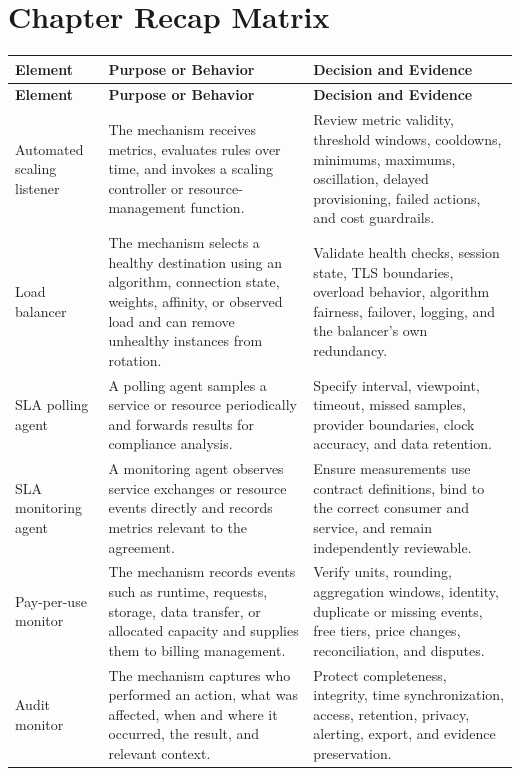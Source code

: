 \documentclass[11pt]{article}
\begin{document}
\section{Chapter Recap Matrix}
\begingroup\small\setlength{\tabcolsep}{4pt}
\begin{longtable}{@{}>{\RaggedRight\arraybackslash}p{}>{\RaggedRight\arraybackslash}p{}>{\RaggedRight\arraybackslash}p{}@{}}
\toprule\rowcolor{Navy}\color{white}\textbf{Element} & \color{white}\textbf{Purpose or Behavior} & \color{white}\textbf{Decision and Evidence}\\\midrule\endfirsthead
\toprule\rowcolor{Navy}\color{white}\textbf{Element} & \color{white}\textbf{Purpose or Behavior} & \color{white}\textbf{Decision and Evidence}\\\midrule\endhead
Automated scaling listener & The mechanism receives metrics, evaluates rules over time, and invokes a scaling controller or resource-management function. & Review metric validity, threshold windows, cooldowns, minimums, maximums, oscillation, delayed provisioning, failed actions, and cost guardrails. \\\midrule
Load balancer & The mechanism selects a healthy destination using an algorithm, connection state, weights, affinity, or observed load and can remove unhealthy instances from rotation. & Validate health checks, session state, TLS boundaries, overload behavior, algorithm fairness, failover, logging, and the balancer's own redundancy. \\\midrule
SLA polling agent & A polling agent samples a service or resource periodically and forwards results for compliance analysis. & Specify interval, viewpoint, timeout, missed samples, provider boundaries, clock accuracy, and data retention. \\\midrule
SLA monitoring agent & A monitoring agent observes service exchanges or resource events directly and records metrics relevant to the agreement. & Ensure measurements use contract definitions, bind to the correct consumer and service, and remain independently reviewable. \\\midrule
Pay-per-use monitor & The mechanism records events such as runtime, requests, storage, data transfer, or allocated capacity and supplies them to billing management. & Verify units, rounding, aggregation windows, identity, duplicate or missing events, free tiers, price changes, reconciliation, and disputes. \\\midrule
Audit monitor & The mechanism captures who performed an action, what was affected, when and where it occurred, the result, and relevant context. & Protect completeness, integrity, time synchronization, access, retention, privacy, alerting, export, and evidence preservation. \\\midrule

\end{longtable}
\end{document}
